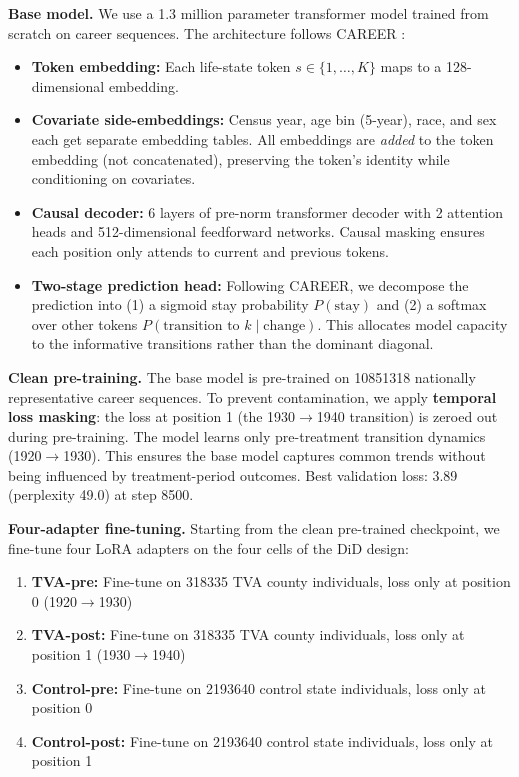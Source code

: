 \documentclass[12pt]{article}
\begin{document}
\textbf{Base model.} We use a 1.3 million parameter transformer model trained from scratch on career sequences. The architecture follows CAREER \citep{vafa2022}:
\begin{itemize}
    \item \textbf{Token embedding:} Each life-state token $s \in \{1, \ldots, K\}$ maps to a 128-dimensional embedding.
    \item \textbf{Covariate side-embeddings:} Census year, age bin (5-year), race, and sex each get separate embedding tables. All embeddings are \textit{added} to the token embedding (not concatenated), preserving the token's identity while conditioning on covariates.
    \item \textbf{Causal decoder:} 6 layers of pre-norm transformer decoder with 2 attention heads and 512-dimensional feedforward networks. Causal masking ensures each position only attends to current and previous tokens.
    \item \textbf{Two-stage prediction head:} Following CAREER, we decompose the prediction into (1) a sigmoid stay probability $P(\text{stay})$ and (2) a softmax over other tokens $P(\text{transition to } k \mid \text{change})$. This allocates model capacity to the informative transitions rather than the dominant diagonal.
\end{itemize}

\textbf{Clean pre-training.} The base model is pre-trained on \num{10851318} nationally representative career sequences. To prevent contamination, we apply \textbf{temporal loss masking}: the loss at position 1 (the 1930$\to$1940 transition) is zeroed out during pre-training. The model learns only pre-treatment transition dynamics (1920$\to$1930). This ensures the base model captures common trends without being influenced by treatment-period outcomes. Best validation loss: 3.89 (perplexity 49.0) at step \num{8500}.

\textbf{Four-adapter fine-tuning.} Starting from the clean pre-trained checkpoint, we fine-tune four LoRA adapters on the four cells of the DiD design:
\begin{enumerate}
    \item \textbf{TVA-pre:} Fine-tune on \num{318335} TVA county individuals, loss only at position 0 (1920$\to$1930)
    \item \textbf{TVA-post:} Fine-tune on \num{318335} TVA county individuals, loss only at position 1 (1930$\to$1940)
    \item \textbf{Control-pre:} Fine-tune on \num{2193640} control state individuals, loss only at position 0
    \item \textbf{Control-post:} Fine-tune on \num{2193640} control state individuals, loss only at position 1
\end{enumerate}
\end{document}

